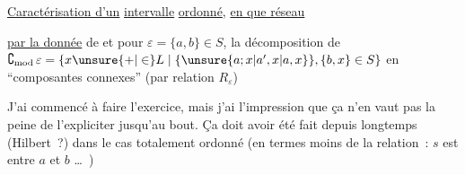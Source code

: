 \uline{Caractérisation d'un} \uline{intervalle}  \uline{ordonné}, \uline{en  que réseau}

\uline{par la donnée} de
et pour $\varepsilon=\{a,b\}\in S$, la décomposition de  $\complement_{\mathrm{mod}}\,\varepsilon=\{x\unsure{+|\in}L\mid\{\unsure{a;x|a',x|a,x}\},\{b,x\}\in S\}$ en ``composantes connexes'' (par relation $R_\varepsilon$)

J'ai commencé à faire l'exercice, mais j'ai l'impression que ça n'en vaut pas la peine de l'expliciter jusqu'au bout. Ça doit avoir été fait depuis longtemps (Hilbert~?) dans le cas totalement ordonné  (en termes  moins de la relation~: $s$ est entre $a$ et $b$ \ldots\ )
